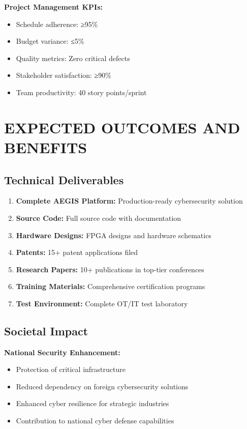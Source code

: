 \documentclass[12pt,a4paper]{article}
\begin{document}
\textbf{Project Management KPIs:}
\begin{itemize}
    \item Schedule adherence: ≥95\%
    \item Budget variance: ≤5\%
    \item Quality metrics: Zero critical defects
    \item Stakeholder satisfaction: ≥90\%
    \item Team productivity: 40 story points/sprint
\end{itemize}

\newpage

\section{EXPECTED OUTCOMES AND BENEFITS}

\subsection{Technical Deliverables}

\begin{enumerate}
    \item \textbf{Complete AEGIS Platform:} Production-ready cybersecurity solution
    \item \textbf{Source Code:} Full source code with documentation
    \item \textbf{Hardware Designs:} FPGA designs and hardware schematics
    \item \textbf{Patents:} 15+ patent applications filed
    \item \textbf{Research Papers:} 10+ publications in top-tier conferences
    \item \textbf{Training Materials:} Comprehensive certification programs
    \item \textbf{Test Environment:} Complete OT/IT test laboratory
\end{enumerate}

\subsection{Societal Impact}

\textbf{National Security Enhancement:}
\begin{itemize}
    \item Protection of critical infrastructure
    \item Reduced dependency on foreign cybersecurity solutions
    \item Enhanced cyber resilience for strategic industries
    \item Contribution to national cyber defense capabilities
\end{itemize}
\end{document}
